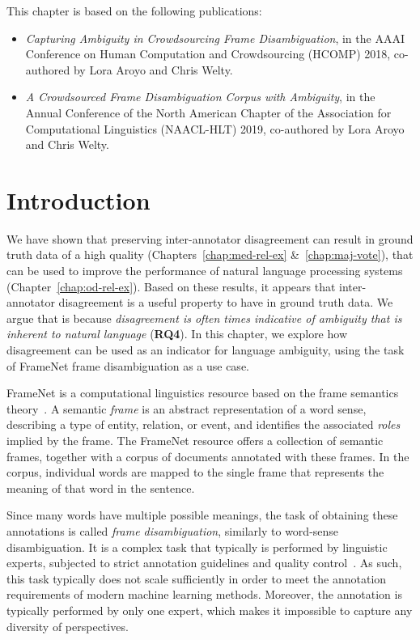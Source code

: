 This chapter is based on the following publications:
\begin{itemize}
    \item \textit{Capturing Ambiguity in Crowdsourcing Frame Disambiguation}, in the AAAI Conference on Human Computation and Crowdsourcing (HCOMP) 2018, co-authored by Lora Aroyo and Chris Welty.~\cite{DBLP:conf/hcomp/DumitracheAW18}
    
    \item \textit{A Crowdsourced Frame Disambiguation Corpus with Ambiguity}, in the Annual Conference of the North American Chapter of the Association for Computational Linguistics (NAACL-HLT) 2019, co-authored by Lora Aroyo and Chris Welty.~\cite{dumitrache2019frames}
\end{itemize}


\section{Introduction}


We have shown that preserving inter-annotator disagreement can result in ground truth data of a high quality (Chapters~\ref{chap:med-rel-ex} \&~\ref{chap:maj-vote}), that can be used to improve the performance of natural language processing systems (Chapter~\ref{chap:od-rel-ex}). Based on these results, it appears that inter-annotator disagreement is a useful property to have in ground truth data. We argue that is because \textit{disagreement is often times indicative of ambiguity that is inherent to natural language} (\textbf{RQ4}). In this chapter, we explore how disagreement can be used as an indicator for language ambiguity, using the task of FrameNet frame disambiguation as a use case.

FrameNet is a computational linguistics resource based on the frame semantics theory~\cite{baker1998berkeley}. A semantic \textit{frame} is an abstract representation of a word sense, describing a type of entity, relation, or event, and identifies the associated \emph{roles} implied by the frame. The FrameNet resource offers a collection of semantic frames, together with a corpus of documents annotated with these frames. In the corpus, individual words are mapped to the single frame that represents the meaning of that word in the sentence.  

Since many words have multiple possible meanings, the task of obtaining these annotations is called \emph{frame disambiguation}, similarly to word-sense disambiguation.  It is a complex task that typically is performed by linguistic experts, subjected to strict annotation guidelines and quality control~\cite{baker2012framenet}. As such, this task typically does not scale sufficiently in order to meet the annotation requirements of modern machine learning methods. Moreover, the annotation is typically performed by only one expert, which makes it impossible to capture any diversity of perspectives.  

